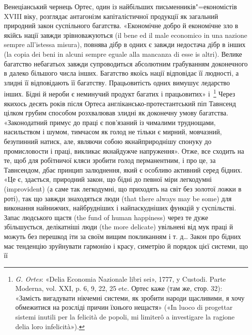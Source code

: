 Венеціанський чернець Ортес, один із найбільших письменників"=економістів
XVIII віку, розглядає антагонізм капіталістичної
продукції як загальний природний закон суспільного
багатства. «Економічне добро й економічне зло в якійсь нації
завжди зрівноважуються (il bene ed il male economico in una
nazione sempre all’istessa misura), повнява дібр в одних є завжди
недостача дібр в інших (la copia dei beni in alcuni sempre eguale
alla mancanza di esse is altri). Велике багатство небагатьох завжди
супроводиться абсолютним грабуванням доконечного в далеко
більшого числа інших. Багатство якоїсь нації відповідає її людності,
а злидні її відповідають її багатству. Працьовитість одних
вимушує ледарство інших. Бідні й нероби є неминучий продукт
багатих і працьовитих» і~\footnote{
\emph{G. Ortes}: «Delia Economia Nazionale libri sei», 1777, y Custodi.
Parte Moderna, vol. XXI, p. 6, 9, 22, 25 etc. Ортес каже (там же, стор. 32):
«Замість вигадувати нікчемні системи, як зробити народи щасливими,
я хочу обмежитися на розсліді причин їхнього нещастя» («In luoco di
progettar sistemi inutili per la felicità de popoli, mi limiterô a investigare
la ragione delia loro infelicità»).
} Через якихось десять років
після Ортеса англікансько-протестантський піп Тавнсенд цілком
грубим способом розхвалював злидні як доконечну умову
багатства. «Законодатний примус до праці є пов’язаний із чималими
труднощами, насильством і шумом, тимчасом як голод не
тільки є мирний, мовчазний, безупинний натиск, але, являючи
собою якнайприроднішу спонуку до промисловости і праці, викликає
якнайдужче напруження». Отже, все сходить на те, щоб
для робітничої кляси зробити голод перманентним, і про це, за
Тавнсендом, дбає принцип залюднення, який є особливо активний
серед бідних. «Це є, здається, природний закон, що бідні
до певної міри легкодумні (improvident) (а саме так легкодумні,
що приходять на світ без золотої ложки в роті), так що завжди
знаходяться люди (that there always may be some) для виконання
найнижчих, найбрудніших і найпаскудніших функцій у суспільстві.
Запас людського щастя (the fund of human happiness) через
те дуже збільшується, делікатніші люди (the more delicate) увільнені
від мук праці й можуть без перешкод іти за своїм вищим
покликанням і т. д\dots{} Закон про бідних має тенденцію зруйнувати
гармонію і красу, симетрію й порядок цієї системи, що її
\parbreak{}  %
